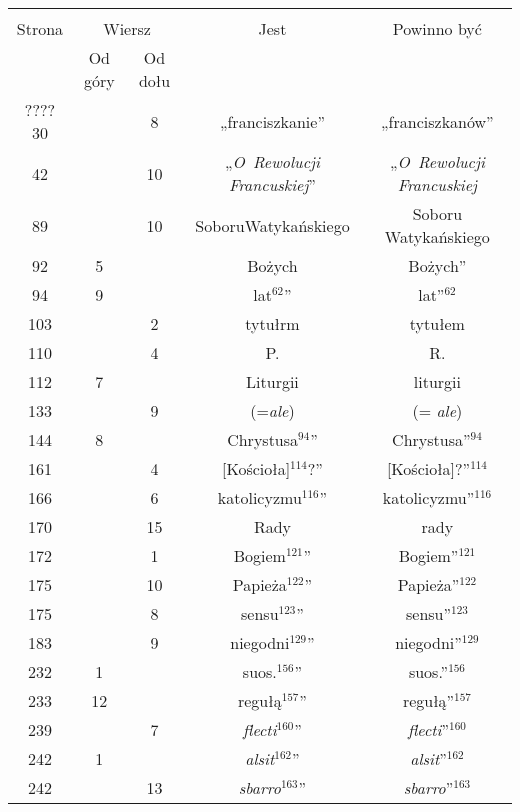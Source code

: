 \documentclass[a4paper,11pt]{article}
\begin{document}
\begin{center}

  \begin{tabular}{|c|c|c|c|c|}
    \hline
    & \multicolumn{2}{c|}{} & & \\
    Strona & \multicolumn{2}{c|}{Wiersz} & Jest
                              & Powinno być \\ \cline{2-3}
    & Od góry & Od dołu & & \\
    \hline
    ????
    30  & &  8 & „franciszkanie” & „franciszkanów” \\
    42  & & 10 & „\textit{O~Rewolucji Francuskiej}”
           & „\textit{O~Rewolucji Francuskiej} \\
    89  & & 10 & SoboruWatykańskiego & Soboru Watykańskiego \\
    92  &  5 & & Bożych & Bożych” \\
    94  &  9 & & lat$^{ 62 }$” & lat”$^{ 62 }$ \\
    103 & &  2 & tytułrm & tytułem \\
    110 & &  4 & P. & R. \\
    112 &  7 & & Liturgii & liturgii \\
    133 & &  9 & (=\textit{ale}) & (= \textit{ale}) \\
    144 &  8 & & Chrystusa$^{ 94 }$” & Chrystusa”$^{ 94 }$\\
    161 & &  4 & [Kościoła]$^{ 114 }$?” & [Kościoła]?”$^{ 114 }$ \\
    166 & &  6 & katolicyzmu$^{ 116 }$” & katolicyzmu”$^{ 116 }$ \\
    170 & & 15 & Rady & rady \\
    172 & &  1 & Bogiem$^{ 121 }$” & Bogiem”$^{ 121 }$ \\
    175 & & 10 & Papieża$^{ 122 }$” & Papieża”$^{ 122 }$ \\
    175 & &  8 & sensu$^{ 123 }$” & sensu”$^{ 123 }$ \\
    183 & &  9 & niegodni$^{ 129 }$” & niegodni”$^{ 129 }$ \\
    232 &  1 & & suos.$^{ 156 }$” & suos.”$^{ 156 }$ \\
    233 & 12 & & regułą$^{ 157 }$” & regułą”$^{ 157 }$ \\
    239 & &  7 & \textit{flecti}$^{ 160 }$” & \textit{flecti}”$^{ 160 }$ \\
    242 &  1 & & \textit{alsit}$^{ 162 }$” & \textit{alsit}”$^{ 162 }$ \\
    242 & & 13 & \textit{sbarro}$^{ 163 }$” & \textit{sbarro}”$^{ 163 }$ \\

\end{tabular}
\end{center}
\end{document}
